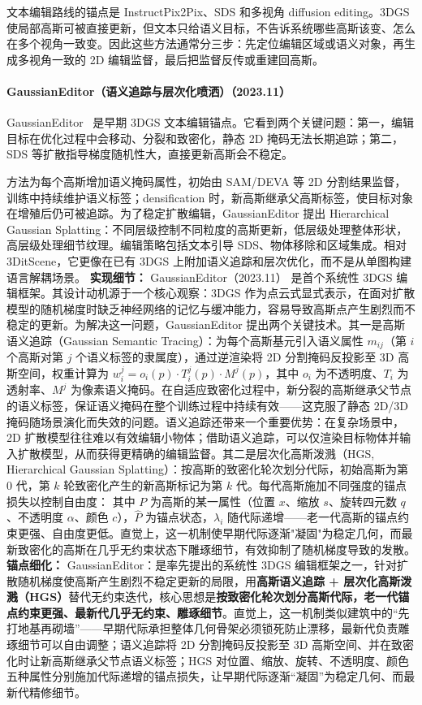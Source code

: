 文本编辑路线的锚点是 InstructPix2Pix、SDS 和多视角 diffusion editing。3DGS 使局部高斯可被直接更新，但文本只给语义目标，不告诉系统哪些高斯该变、怎么在多个视角一致变。因此这些方法通常分三步：先定位编辑区域或语义对象，再生成多视角一致的 2D 编辑监督，最后把监督反传或重建回高斯。
\paragraph{GaussianEditor（语义追踪与层次化喷洒）（2023.11）}
GaussianEditor~\cite{2311_14521} 是早期 3DGS 文本编辑锚点。它看到两个关键问题：第一，编辑目标在优化过程中会移动、分裂和致密化，静态 2D 掩码无法长期追踪；第二，SDS 等扩散指导梯度随机性大，直接更新高斯会不稳定。

方法为每个高斯增加语义掩码属性，初始由 SAM/DEVA 等 2D 分割结果监督，训练中持续维护语义标签；densification 时，新高斯继承父高斯标签，使目标对象在增殖后仍可被追踪。为了稳定扩散编辑，GaussianEditor 提出 Hierarchical Gaussian Splatting：不同层级控制不同粒度的高斯更新，低层级处理整体形状，高层级处理细节纹理。编辑策略包括文本引导 SDS、物体移除和区域集成。相对 3DitScene，它更像在已有 3DGS 上附加语义追踪和层次优化，而不是从单图构建语言解耦场景。
\textbf{实现细节：} GaussianEditor（2023.11） 是首个系统性 3DGS 编辑框架。其设计动机源于一个核心观察：3DGS 作为点云式显式表示，在面对扩散模型的随机梯度时缺乏神经网络的记忆与缓冲能力，容易导致高斯点产生剧烈而不稳定的更新。为解决这一问题，GaussianEditor 提出两个关键技术。其一是高斯语义追踪（Gaussian Semantic Tracing）：为每个高斯基元引入语义属性 $m_{ij}$（第 $i$ 个高斯对第 $j$ 个语义标签的隶属度），通过逆渲染将 2D 分割掩码反投影至 3D 高斯空间，权重计算为 $w_i^j = o_i(p) \cdot T_i^j(p) \cdot M^j(p)$，其中 $o_i$ 为不透明度、$T_i$ 为透射率、$M^j$ 为像素语义掩码。在自适应致密化过程中，新分裂的高斯继承父节点的语义标签，保证语义掩码在整个训练过程中持续有效——这克服了静态 2D/3D 掩码随场景演化而失效的问题。语义追踪还带来一个重要优势：在复杂场景中，2D 扩散模型往往难以有效编辑小物体；借助语义追踪，可以仅渲染目标物体并输入扩散模型，从而获得更精确的编辑监督。其二是层次化高斯泼溅（HGS, Hierarchical Gaussian Splatting）：按高斯的致密化轮次划分代际，初始高斯为第 0 代，第 $k$ 轮致密化产生的新高斯标记为第 $k$ 代。每代高斯施加不同强度的锚点损失以控制自由度： 其中 $P$ 为高斯的某一属性（位置 $x$、缩放 $s$、旋转四元数 $q$、不透明度 $\alpha$、颜色 $c$），$\hat{P}$ 为锚点状态，$\lambda_i$ 随代际递增——老一代高斯的锚点约束更强、自由度更低。直觉上，这一机制使早期代际逐渐"凝固"为稳定几何，而最新致密化的高斯在几乎无约束状态下雕琢细节，有效抑制了随机梯度导致的发散。
\textbf{锚点细化：} GaussianEditor：是率先提出的系统性 3DGS 编辑框架之一，针对扩散随机梯度使高斯产生剧烈不稳定更新的局限，用\textbf{高斯语义追踪 + 层次化高斯泼溅（HGS）}替代无约束迭代，核心思想是\textbf{按致密化轮次划分高斯代际，老一代锚点约束更强、最新代几乎无约束、雕琢细节}。直觉上，这一机制类似建筑中的``先打地基再砌墙''——早期代际承担整体几何骨架必须锁死防止漂移，最新代负责雕琢细节可以自由调整；语义追踪将 2D 分割掩码反投影至 3D 高斯空间、并在致密化时让新高斯继承父节点语义标签；HGS 对位置、缩放、旋转、不透明度、颜色五种属性分别施加代际递增的锚点损失，让早期代际逐渐``凝固''为稳定几何、而最新代精修细节。

